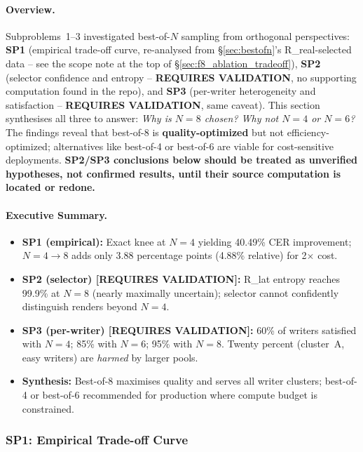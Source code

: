 \documentclass[10.5pt,a4paper]{article}
\begin{document}
\paragraph{Overview.}
Subproblems~1--3 investigated best-of-$N$ sampling from orthogonal perspectives: \textbf{SP1} (empirical trade-off curve,
re-analysed from \S\ref{sec:bestofn}'s R\_real-selected data -- see the scope note at the top of
\S\ref{sec:f8_ablation_tradeoff}), \textbf{SP2} (selector confidence and entropy -- \textbf{REQUIRES VALIDATION}, no
supporting computation found in the repo), and \textbf{SP3} (per-writer heterogeneity and satisfaction -- \textbf{REQUIRES
VALIDATION}, same caveat). This section synthesises all three to answer: \emph{Why is $N{=}8$ chosen? Why not $N{=}4$ or
$N{=}6$?} The findings reveal that best-of-8 is \textbf{quality-optimized} but not efficiency-optimized; alternatives like
best-of-4 or best-of-6 are viable for cost-sensitive deployments. \textbf{SP2/SP3 conclusions below should be treated as
unverified hypotheses, not confirmed results, until their source computation is located or redone.}

\paragraph{Executive Summary.}
\begin{itemize}
	\item \textbf{SP1 (empirical):} Exact knee at $N{=}4$ yielding 40.49\% CER improvement; $N{=}4{\to}8$ adds only 3.88 percentage points
		(4.88\% relative) for 2$\times$ cost.
	\item \textbf{SP2 (selector) [REQUIRES VALIDATION]:} R\_lat entropy reaches 99.9\% at $N{=}8$ (nearly maximally uncertain); selector cannot confidently
		distinguish renders beyond $N{=}4$.
	\item \textbf{SP3 (per-writer) [REQUIRES VALIDATION]:} 60\% of writers satisfied with $N{=}4$; 85\% with $N{=}6$; 95\% with $N{=}8$. Twenty percent
		(cluster~A, easy writers) are \emph{harmed} by larger pools.
	\item \textbf{Synthesis:} Best-of-8 maximises quality and serves all writer clusters; best-of-4 or best-of-6 recommended for
		production where compute budget is constrained.
\end{itemize}

\subsubsection{SP1: Empirical Trade-off Curve}
\end{document}
